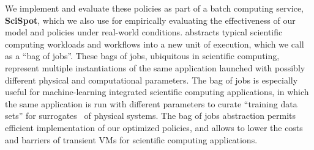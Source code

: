 We implement and evaluate these policies as part of a batch computing service, \textbf{SciSpot}, which we also use for empirically evaluating the effectiveness of our model and policies under real-world conditions. 
%
\sysname abstracts typical scientific computing workloads and workflows into a new unit of execution, which we call as a ``bag of jobs''. 
These bags of jobs, ubiquitous in scientific computing, represent multiple instantiations of the same application launched with possibly different physical and computational parameters.
The bag of jobs is especially useful for machine-learning integrated scientific computing applications, in which the same application is run with different parameters to curate ``training data sets'' for surrogates~\cite{kadupitiya2020machine2} of physical systems.
%
The bag of jobs abstraction permits efficient implementation of our optimized policies, and allows \sysname to lower the costs and barriers of transient VMs for scientific computing applications.


